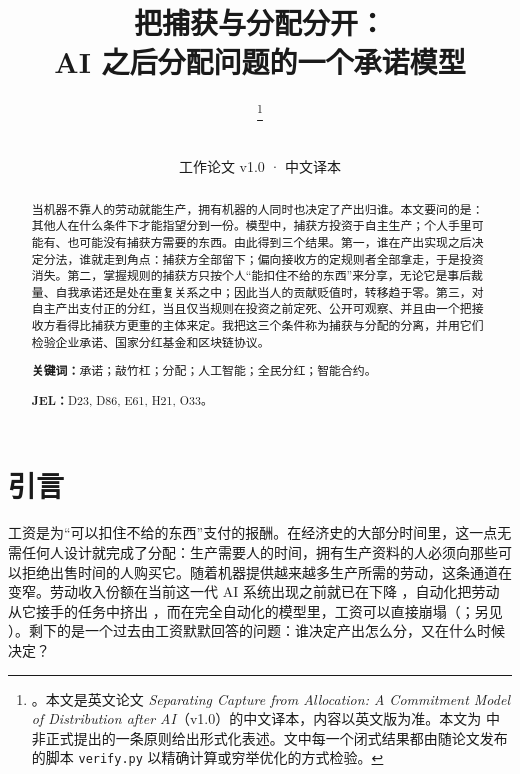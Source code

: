 \newcommand{\half}{\tfrac{1}{2}}

\title{\textbf{把捕获与分配分开：\\[4pt] AI 之后分配问题的一个承诺模型}}
\author{\PaperAuthor\thanks{\PaperAffiliation。本文是英文论文 \textit{Separating Capture from Allocation: A
Commitment Model of Distribution after AI}（v1.0）的中文译本，内容以英文版为准。本文为
\citet{Titan2026} 中非正式提出的一条原则给出形式化表述。文中每一个闭式结果都由随论文发布的脚本 \texttt{verify.py} 以精确计算或穷举优化的方式检验。}}
\date{\PaperDate\\[2pt]{\small 工作论文 v1.0 · 中文译本}}


\maketitle

\begin{abstract}
\noindent 当机器不靠人的劳动就能生产，拥有机器的人同时也决定了产出归谁。本文要问的是：其他人在什么条件下才能指望分到一份。模型中，捕获方投资于自主生产；个人手里可能有、也可能没有捕获方需要的东西。由此得到三个结果。第一，谁在产出实现之后决定分法，谁就走到角点：捕获方全部留下；偏向接收方的定规则者全部拿走，于是投资消失。第二，掌握规则的捕获方只按个人“能扣住不给的东西”来分享，无论它是事后裁量、自我承诺还是处在重复关系之中；因此当人的贡献贬值时，转移趋于零。第三，对自主产出支付正的分红，当且仅当规则在投资之前定死、公开可观察、并且由一个把接收方看得比捕获方更重的主体来定。我把这三个条件称为捕获与分配的分离，并用它们检验企业承诺、国家分红基金和区块链协议。

\medskip
\noindent\textbf{关键词：}承诺；敲竹杠；分配；人工智能；全民分红；智能合约。

\noindent\textbf{JEL：}D23, D86, E61, H21, O33。
\end{abstract}

\section{引言}

工资是为“可以扣住不给的东西”支付的报酬。在经济史的大部分时间里，这一点无需任何人设计就完成了分配：生产需要人的时间，拥有生产资料的人必须向那些可以拒绝出售时间的人购买它。随着机器提供越来越多生产所需的劳动，这条通道在变窄。劳动收入份额在当前这一代 AI 系统出现之前就已在下降 \citep{KarabarbounisNeiman2014}，自动化把劳动从它接手的任务中挤出
\citep{AcemogluRestrepo2018}，而在完全自动化的模型里，工资可以直接崩塌（\citealp{KorinekSuh2024}；另见 \citealp{KorinekStiglitz2019}）。剩下的是一个过去由工资默默回答的问题：谁决定产出怎么分，又在什么时候决定？

